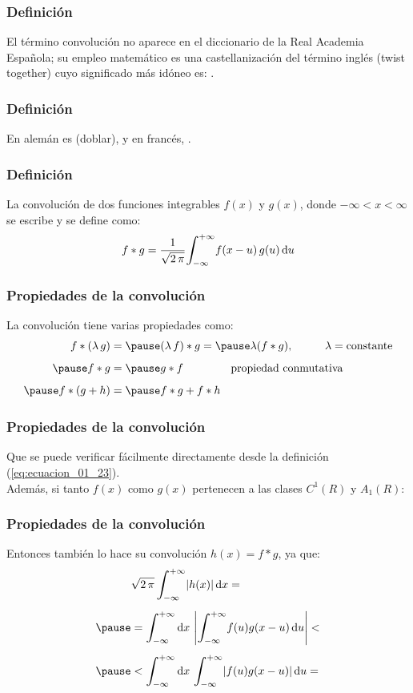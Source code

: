 \begin{frame}
\frametitle{Definición}
El término convolución no aparece en el diccionario de la Real Academia Española; \pause su empleo matemático es una castellanización del término inglés  (twist together) cuyo significado más idóneo es: \pause {}.
\end{frame}
\begin{frame}
\frametitle{Definición}
En alemán es  (doblar), y en francés, .
\end{frame}
\begin{frame}
\frametitle{Definición}
La convolución de dos funciones integrables $f (x)$ y $g (x)$, donde $-\infty < x < \infty$ se escribe y se define como:
\pause
\begin{align}
f * g = \dfrac{1}{\sqrt{2 \, \pi}} \scaleint{6ex}_{\bs -\infty}^{+\infty} f (x - u) \, g (u) \dd{u}
\label{eq:ecuacion_01_23}
\end{align}
\end{frame}
\begin{frame}
\frametitle{Propiedades de la convolución}
La convolución tiene varias propiedades como:
\pause
\begin{eqnarray*}
\begin{aligned}
f * (\lambda \, g) &= \pause (\lambda \, f) * g = \pause \lambda (f * g), \hspace{1cm} \lambda = \mbox{constante} \\[0.5em] \pause
f * g &= \pause g * f \hspace{1.5cm} \mbox{propiedad conmutativa} \\[0.5em] \pause
f * (g + h) &= \pause f * g + f * h
\end{aligned}
\end{eqnarray*}
\end{frame}
\begin{frame}
\frametitle{Propiedades de la convolución}
Que se puede verificar fácilmente directamente desde la definición (\ref{eq:ecuacion_01_23}).
\\
\bigskip
\pause
Además, si tanto $f (x)$ como $g (x)$ pertenecen a las clases $C^{1} (R)$ y $A_{1} (R)$:
\end{frame}
\begin{frame}
\frametitle{Propiedades de la convolución}
Entonces también lo hace su convolución $h (x) = f * g$, ya que:
\pause
\begin{eqnarray*}
\begin{aligned}
&\sqrt{2 \, \pi} \, \scaleint{6ex}_{\bs -\infty}^{+\infty} \abs{h(x)} \dd{x} = \\[0.5em] \pause
&= \scaleint{6ex}_{\bs -\infty}^{+\infty} \dd{x} \, \abs{\scaleint{6ex}_{\bs -\infty}^{+\infty} f (u) g (x - u) \dd{u}} < \\[0.5em] \pause
&< \scaleint{6ex}_{\bs -\infty}^{+\infty} \dd{x} \, \scaleint{6ex}_{\bs -\infty}^{+\infty} \abs{f (u) g (x - u)} \dd{u} = 
\end{aligned}
\end{eqnarray*}
\end{frame}
